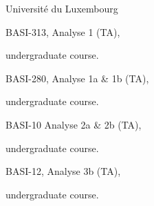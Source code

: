\vspace{0.5em}

{Universit\'e du Luxembourg}
{BASI-313, Analyse 1 (TA),
\begin{footnotesize}
	undergraduate course.
\end{footnotesize}}
{}

{}
{BASI-280, Analyse 1a \& 1b (TA),
\begin{footnotesize}
	undergraduate course.
\end{footnotesize}}
{}

{}
{BASI-10 Analyse 2a \& 2b (TA),
\begin{footnotesize}
	undergraduate course.
\end{footnotesize}}
{}

{}
{BASI-12, Analyse 3b (TA),
\begin{footnotesize}
	undergraduate course.
\end{footnotesize}}
{}